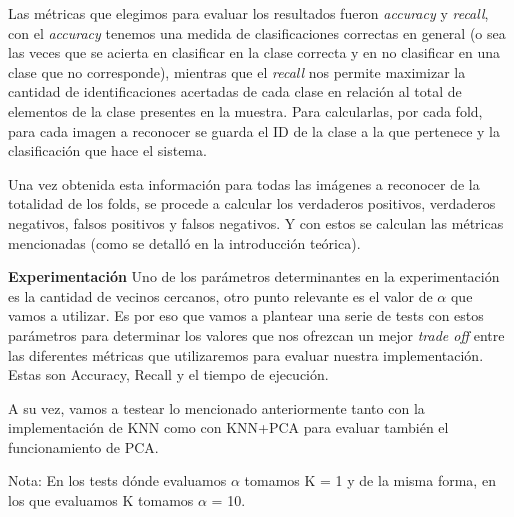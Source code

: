 \par Las métricas que elegimos para evaluar los resultados fueron \textit{accuracy} y \textit{recall}, con el \textit{accuracy} tenemos una medida de clasificaciones correctas en general (o sea las veces que se acierta en clasificar en la clase correcta y en no clasificar en una clase que no corresponde), mientras que el \textit{recall} nos permite maximizar la cantidad de identificaciones acertadas de cada clase en relación al total de elementos de la clase presentes en la muestra.
Para calcularlas, por cada fold, para cada imagen a reconocer se guarda el ID de la clase a la que pertenece y la clasificación que hace el sistema.
\par Una vez obtenida esta información para todas las imágenes a reconocer de la totalidad de los folds, se procede a calcular los verdaderos positivos, verdaderos negativos, falsos positivos y falsos negativos. Y con estos se calculan las métricas mencionadas (como se detalló en la introducción teórica).


\textbf{Experimentación}
Uno de los parámetros determinantes en la experimentación es la cantidad de vecinos cercanos, otro punto relevante es el valor de $\alpha$ que vamos a utilizar. Es por eso que vamos a plantear una serie de tests con estos parámetros para determinar los valores que nos ofrezcan un mejor \textit{trade off} entre las diferentes métricas que utilizaremos para evaluar nuestra implementación.\newline
Estas son Accuracy, Recall y el tiempo de ejecución.

A su vez, vamos a testear lo mencionado anteriormente tanto con la implementación de KNN como con KNN+PCA para evaluar también el funcionamiento de PCA. 

Nota: En los tests dónde evaluamos $\alpha$ tomamos K = 1 y de la misma forma, en los que evaluamos K tomamos $\alpha$ = 10. 

